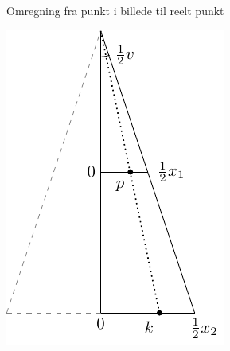\begin{frame}{Omregning fra punkt i billede til reelt punkt}

\centering
\includegraphics[scale=1]{conversion_figure}

\end{frame}








